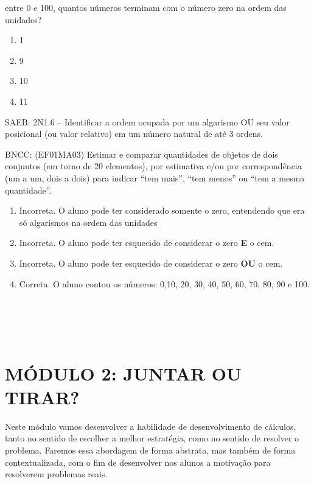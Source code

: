 entre 0 e 100, quantos números terminam com o número zero na ordem das
unidades?

\begin{enumerate}
\def\labelenumi{\Alph{enumi})}
\item
  1
\item
  9
\item
  10
\item
  11
\end{enumerate}

SAEB: 2N1.6 -- Identificar a ordem ocupada por um algarismo OU seu valor
posicional (ou valor relativo) em um número natural de até 3 ordens.

BNCC: (EF01MA03) Estimar e comparar quantidades de objetos de dois
conjuntos (em torno de 20 elementos), por estimativa e/ou por
correspondência (um a um, dois a dois) para indicar ``tem mais'', ``tem
menos'' ou ``tem a mesma quantidade''.

\begin{enumerate}
\def\labelenumi{\alph{enumi})}
\item
  Incorreta. O aluno pode ter considerado somente o zero, entendendo que
  era só algarismos na ordem das unidades
\item
  Incorreta. O aluno pode ter esquecido de considerar o zero \textbf{E}
  o cem.
\item
  Incorreta. O aluno pode ter esquecido de considerar o zero \textbf{OU}
  o cem.
\item
  Correta. O aluno contou os números: 0,10, 20, 30, 40, 50, 60, 70, 80,
  90 e 100.
\end{enumerate}

\section{\texorpdfstring{\\
}{ }}\label{section-7}

\section{MÓDULO 2: JUNTAR OU TIRAR?}\label{muxf3dulo-2-juntar-ou-tirar}

Neste módulo vamos desenvolver a habilidade de desenvolvimento de
cálculos, tanto no sentido de escolher a melhor estratégia, como no
sentido de resolver o problema. Faremos essa abordagem de forma
abstrata, mas também de forma contextualizada, com o fim de desenvolver
nos alunos a motivação para resolverem problemas reais.

